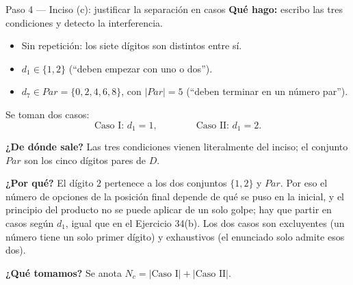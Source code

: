 \documentclass[11pt]{article}
\begin{document}
\begin{paso}{Paso 4 --- Inciso (c): justificar la separación en casos}
\textbf{Qué hago:} escribo las tres condiciones y detecto la interferencia.
\begin{itemize}[leftmargin=*]
  \item Sin repetición: los siete dígitos son distintos entre sí.
  \item $d_1\in\{1,2\}$ (``deben empezar con uno o dos'').
  \item $d_7\in Par=\{0,2,4,6,8\}$, con $|Par|=5$ (``deben terminar en un número par'').
\end{itemize}
Se toman dos casos:
\[
  \text{Caso I: } d_1=1,\qquad\qquad \text{Caso II: } d_1=2 .
\]

\textbf{¿De dónde sale?} Las tres condiciones vienen literalmente del inciso; el conjunto $Par$ son los cinco dígitos pares de $D$.

\textbf{¿Por qué?} El dígito $2$ pertenece a los dos conjuntos $\{1,2\}$ y $Par$. Por eso el número de opciones de la posición final depende de qué se puso en la inicial, y el principio del producto no se puede aplicar de un solo golpe; hay que partir en casos según $d_1$, igual que en el Ejercicio 34(b). Los dos casos son excluyentes (un número tiene un solo primer dígito) y exhaustivos (el enunciado solo admite esos dos).

\textbf{¿Qué tomamos?} Se anota $N_c = |\text{Caso I}|+|\text{Caso II}|$.
\end{paso}
\end{document}
